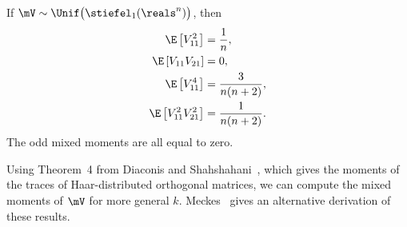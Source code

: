 \begin{lemma}\label{L:stiefel-1-moments}
    If $\mV \sim \Unif\big( \stiefel_1(\reals^n) \big)$, then
    \begin{subequations}
    \begin{align*}
        \E \left[ V_{11}^2 \right] 
            &= \frac{1}{n}, \\
        \E \left[ V_{11} V_{21} \right] 
            &= 0, \\
        \E \left[ V_{11}^4 \right] 
            &= \frac{3}{n (n + 2)}, \\
        \E \left[ V_{11}^2 V_{21}^2 \right] 
            &= \frac{1}{n (n + 2)}.
    \end{align*}
    \end{subequations}
    The odd mixed moments are all equal to zero.
\end{lemma}

Using Theorem~4 from Diaconis and Shahshahani~\cite{diaconis1994erm},
which gives the moments of the traces of Haar-distributed orthogonal
matrices, we can compute the mixed moments of $\mV$ for more general $k$.
Meckes~\cite{meckes2006ivs} gives an alternative derivation of these
results.

